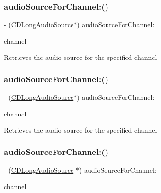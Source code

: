 \subsubsection{\texorpdfstring{audio\+Source\+For\+Channel\+:()}{audioSourceForChannel:()}\hspace{0.1cm}{\footnotesize\ttfamily [2/4]}}
{\footnotesize\ttfamily -\/ (\hyperlink{interfaceCDLongAudioSource}{C\+D\+Long\+Audio\+Source}$\ast$) audio\+Source\+For\+Channel\+: \begin{DoxyParamCaption}\item[{(t\+Audio\+Source\+Channel)}]{channel }\end{DoxyParamCaption}}

Retrieves the audio source for the specified channel \mbox{\label{interfaceCDAudioManager_a07f9dbc2d03a610a187675c6cfb24893}} 
\subsubsection{\texorpdfstring{audio\+Source\+For\+Channel\+:()}{audioSourceForChannel:()}\hspace{0.1cm}{\footnotesize\ttfamily [3/4]}}
{\footnotesize\ttfamily -\/ (\hyperlink{interfaceCDLongAudioSource}{C\+D\+Long\+Audio\+Source}$\ast$) audio\+Source\+For\+Channel\+: \begin{DoxyParamCaption}\item[{(t\+Audio\+Source\+Channel)}]{channel }\end{DoxyParamCaption}}

Retrieves the audio source for the specified channel \mbox{\label{interfaceCDAudioManager_a07c2429b4ae8340c5aefe21c381f102f}} 
\subsubsection{\texorpdfstring{audio\+Source\+For\+Channel\+:()}{audioSourceForChannel:()}\hspace{0.1cm}{\footnotesize\ttfamily [4/4]}}
{\footnotesize\ttfamily -\/ (\hyperlink{interfaceCDLongAudioSource}{C\+D\+Long\+Audio\+Source} $\ast$) audio\+Source\+For\+Channel\+: \begin{DoxyParamCaption}\item[{(t\+Audio\+Source\+Channel)}]{channel }\end{DoxyParamCaption}}

